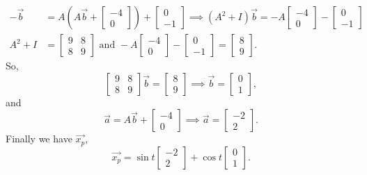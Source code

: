 \begin{align*}
	-\vec{b} &= A\left(A\vec{b} + \begin{bmatrix}
		-4 \\
		0
	\end{bmatrix}\right) + \begin{bmatrix}
		0 \\
		-1
	\end{bmatrix} \implies (A^2 + I)\vec{b} = -A\begin{bmatrix}
		-4 \\
		0
	\end{bmatrix} - \begin{bmatrix}
		0 \\
		-1
	\end{bmatrix} \\
	A^2 + I &= \begin{bmatrix}
		9 & 8 \\
		8 & 9
	\end{bmatrix} \text{ and } -A\begin{bmatrix}
		-4 \\
		0
	\end{bmatrix} - \begin{bmatrix}
		0 \\
		-1
	\end{bmatrix} = \begin{bmatrix}
		8 \\
		9
	\end{bmatrix}.
\end{align*}
So,
\begin{equation*}
	\begin{bmatrix}
		9 & 8 \\
		8 & 9
	\end{bmatrix}\vec{b} = \begin{bmatrix}
		8 \\
		9
	\end{bmatrix} \implies \vec{b} = \begin{bmatrix}
		0 \\
		1
	\end{bmatrix},
\end{equation*}
and
\begin{equation*}
	\vec{a} = A\vec{b} + \begin{bmatrix}
		-4 \\
		0
	\end{bmatrix} \implies \vec{a} = \begin{bmatrix}
		-2 \\
		2
	\end{bmatrix}.
\end{equation*}
Finally we have $\vec{x_p}$,
\begin{equation*}
	\vec{x_p} = \sin{t}\begin{bmatrix}
		-2 \\
		2
	\end{bmatrix} + \cos{t}\begin{bmatrix}
		0 \\
		1
	\end{bmatrix}.
\end{equation*}